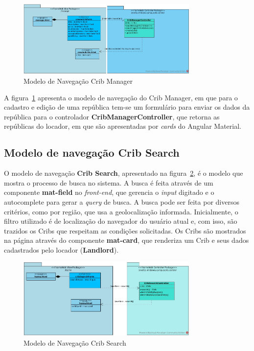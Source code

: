 \begin{figure}[h]
	\centering
	\includegraphics[width=0.8\textwidth]{figuras/modelo-de-navegacao-crib-manager.jpg}
	\caption{Modelo de Navegação Crib Manager}
	\label{figura-arquitetura-nav-crib-manager}
\end{figure}

A figura~\ref{figura-arquitetura-nav-crib-manager} apresenta o modelo de navegação do Crib Manager, em que para o cadastro e edição de uma república tem-se um formulário para enviar os dados da república para o controlador \textbf{CribManagerController}, que retorna as repúblicas do locador, em que são apresentadas por \textit{cards} do Angular Material.

\subsection{Modelo de navegação Crib Search}

O modelo de navegação \textbf{Crib Search}, apresentado na figura~\ref{figura-arquitetura-nav-crib-search}, é o modelo que mostra o processo de busca no sistema. A busca é feita através de um componente \textbf{mat-field} no \textit{front-end}, que gerencia o \textit{input} digitado e o autocomplete para gerar a \textit{query} de busca. A busca pode ser feita por diversos critérios, como por região, que usa a geolocalização informada. Inicialmente, o filtro utilizado é de localização do navegador do usuário atual e, com isso, são trazidos os Cribs que respeitam as condições solicitadas. Os Cribs são mostrados na página através do componente \textbf{mat-card}, que renderiza um Crib e seus dados cadastrados pelo locador (\textbf{Landlord}).

\begin{figure}[h]
	\centering
	\includegraphics[width=0.8\textwidth]{figuras/modelo-de-navegacao-crib-search.jpg}
	\caption{Modelo de Navegação Crib Search}
	\label{figura-arquitetura-nav-crib-search}
\end{figure}

